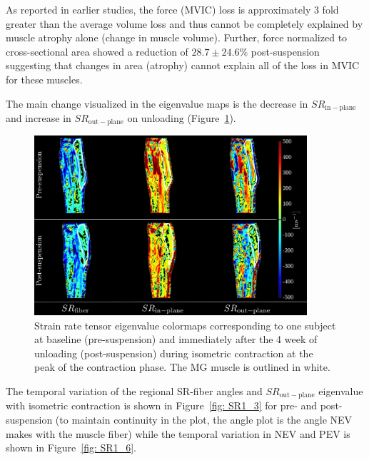  As reported in earlier studies, the force (MVIC) loss is approximately 3 fold greater than the average volume loss and thus cannot be completely explained by muscle atrophy alone (change in muscle volume). 
 Further, force normalized to cross-sectional area showed a reduction of $28.7 \pm 24.6\%$ post-suspension suggesting that changes in area (atrophy) cannot explain all of the loss in MVIC for these muscles.

The main change visualized in the eigenvalue maps is the decrease in $SR_{\mathrm{in-plane}}$ and increase in $SR_{\mathrm{out-plane}}$ on unloading (Figure~\ref{fig: SR1_2}). 
\begin{figure}[!htb]
\vspace{+0.2cm}
\centering
\includegraphics[width=0.9\textwidth]{Figures/ULLSColormaps.pdf}
\caption[Strain rate tensor eigenvalue colormaps pre- and post-suspension]{Strain rate tensor eigenvalue colormaps corresponding to one subject at baseline (pre-suspension) and immediately after the 4 week of unloading (post-suspension) during isometric contraction at the peak of the contraction phase. The MG muscle is outlined in white.}
\label{fig: SR1_2}
\end{figure}
The temporal variation of the regional SR-fiber angles and $SR_\mathrm{out-plane}$ eigenvalue with isometric contraction is shown in Figure~\ref{fig: SR1_3} for pre- and post-suspension (to maintain continuity in the plot, the angle plot is the angle NEV makes with the muscle fiber) while the temporal variation in NEV and PEV is shown in Figure~\ref{fig: SR1_6}.
